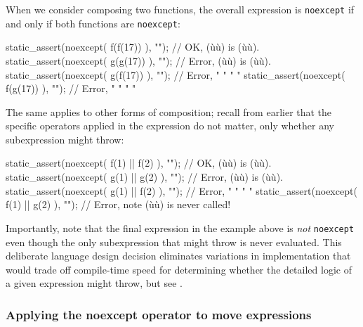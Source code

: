 \noindent When we consider composing two functions, the overall expression is
\lstinline!noexcept! if and only if both functions are \lstinline!noexcept!:

\begin{emcppslisting}[emcppsbatch=e8]
static_assert(noexcept( f(f(17)) ), "");  // OK,    (ù{}ù) is (ù{}ù).
static_assert(noexcept( g(g(17)) ), "");  // Error, (ù{}ù) is (ù{}ù).
static_assert(noexcept( g(f(17)) ), "");  // Error,  "   "      "      "
static_assert(noexcept( f(g(17)) ), "");  // Error,  "   "      "      "
\end{emcppslisting}
    

\noindent The same applies to other forms of composition; recall from earlier that
the specific operators applied in the expression do not matter, only
whether any  subexpression might throw:

\begin{emcppslisting}[emcppsbatch=e8]
static_assert(noexcept( f(1) || f(2) ), "");  // OK,    (ù{}ù) is (ù{}ù).
static_assert(noexcept( g(1) || g(2) ), "");  // Error, (ù{}ù) is (ù{}ù).
static_assert(noexcept( g(1) || f(2) ), "");  // Error,  "   "      "      "
static_assert(noexcept( f(1) || g(2) ), "");  // Error, note (ù{}ù) is never called!
\end{emcppslisting}
    

\noindent Importantly, note that the final expression in the example above is
\emph{not} \lstinline!noexcept! even though the only subexpression that
might throw is never evaluated. This deliberate language design decision
eliminates variations in implementation that would trade off
compile-time speed for determining whether the detailed logic of a given
expression might throw, but see .

\subsubsection[Applying the \lstinline!noexcept! operator to move expressions]{Applying the {\SubsubsecCode noexcept} operator to move expressions}\label{applying-the-noexcept-operator-to-move-expressions}

